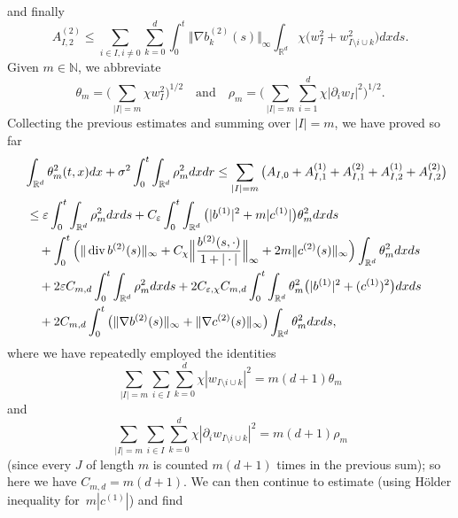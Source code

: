 \documentclass[a4paper,10pt]{article}
\newcommand\1{\mathbbm{1}}
\newcommand{\eps}{\varepsilon}
\DeclareMathOperator{\diverg}{div}
\numberwithin{equation}{section}
\begin{document}
and finally
\begin{equation*}
A_{I,2}^{(2)} \leq \sum_{i\in I,i\neq0} \sum_{k=0}^{d} \int_{0}^{t} \Vert \nabla b_k^{(2)}(s)  \Vert_{\infty} \int_{\mathbb{R}^{d}} \chi \big(w_{I}^{2} + w_{I\setminus i\cup k}^{2} \big)  dxds .
\end{equation*} 
Given $m\in\mathbb{N}$, we abbreviate 
\begin{equation*}
\theta_{m}= \Big(\sum_{\vert I\vert =m} \chi w_{I}^{2} \Big)^{1/2} \quad \text{and} \quad  \rho_{m}= \Big(\sum_{\vert I\vert =m} \sum_{i=1}^{d}\chi\vert \partial_{i}w_{I}\vert^{2} \Big)^{1/2} .
\end{equation*}
Collecting the previous estimates and summing over $|I|=m$, we have proved so far
\begin{align*}
\lefteqn{ \int_{\mathbb{R}^{d}}\theta_{m}^{2}(t,x)dx+\sigma^{2}\int_{0}^{t} 
\int_{\mathbb{R}^{d}}\rho_{m}^{2}dxdr\leq\sum_{\vert I\vert =m} 
\big( A_{I,0} + A_{I,1}^{(1)}+A_{I,1}^{(2)} + A_{I,2}^{(1)}+A_{I,2}^{(2)} \big)} \\
&  \leq \eps\int_{0}^{t}\int_{\mathbb{R}^{d}}\rho_{m}^{2}dxds+C_{\eps} \int_{0}^{t} \int_{\mathbb{R}^{d}} \big( \vert b^{(1)} \vert^{2} + m\vert c^{(1)}\vert \big)  \theta_{m}^{2}dxds\\
&  \quad {} + \int_{0}^{t} \Big(\Vert \diverg b^{(2)}(s) \Vert_{\infty}+ C_{\chi} \Big\Vert \frac{b^{(2)}(s,\cdot)} {1+\vert \cdot\vert} \Big\Vert_{\infty} + 2m \Vert c^{(2)}(s)  \Vert_{\infty} \Big) \int_{\mathbb{R}^{d}} \theta_{m}^{2} dxds\\
& \quad {}+2 \eps C_{m,d}\int_{0}^{t} \int_{\mathbb{R}^{d}} \rho_{m}^{2} dxds + 2C_{\eps,\chi} C_{m,d}\int_{0}^{t} \int_{\mathbb{R}^{d}} \theta_{m}^{2} \big(\vert b^{(1)} \vert^{2}+(c^{(1)})^{2} \big)  dxds\\
& \quad {}+ 2C_{m,d}\int_{0}^{t} \big( \Vert \nabla b^{(2)}(s) \Vert_{\infty} + \Vert \nabla c^{(2)}(s) \Vert_{\infty} \big) \int_{\mathbb{R}^{d}}\theta_{m}^{2} dxds ,
\end{align*}
where we have repeatedly employed the identities 
\begin{equation*}
\sum_{|I|=m}\sum_{i\in I}\sum^d_{k=0}\chi|w_{I\setminus i\cup k}|^2= m(d+1)\theta_m
\end{equation*}
and 
\begin{equation*}
\sum_{|I|=m}\sum_{i\in I}\sum^d_{k=0}\chi|\partial_i w_{I\setminus i\cup k}|^2= m(d+1)\rho_m
\end{equation*}
(since every $J$ of length $m$ is counted $m(d+1)$ times in the previous sum); so here we have $C_{m,d}=m(d+1)$. We can then continue to estimate (using H\"older inequality for~$m|c^{(1)}|$) and find
\end{document}
